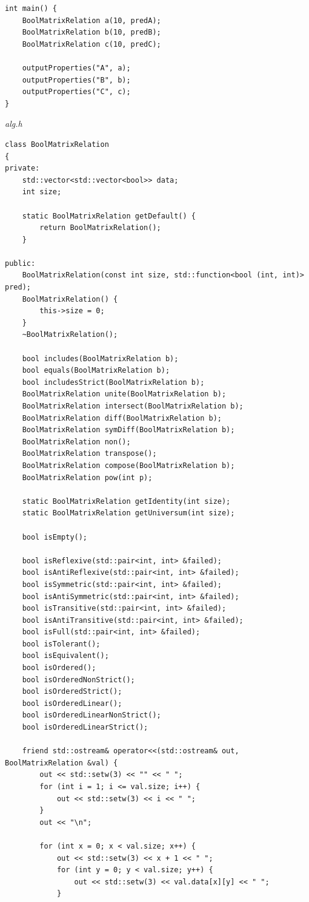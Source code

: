 \documentclass[a4paper,14pt]{extarticle}
\begin{document}
\begin{enumerate}[label=2.\arabic*.]
\begin{verbatim}
int main() {
    BoolMatrixRelation a(10, predA);
    BoolMatrixRelation b(10, predB);
    BoolMatrixRelation c(10, predC);

    outputProperties("A", a);
    outputProperties("B", b);
    outputProperties("C", c);
}
    	\end{verbatim}
	      \textit{alg.h}
	      \begin{verbatim}
class BoolMatrixRelation
{
private:
    std::vector<std::vector<bool>> data;
    int size;

    static BoolMatrixRelation getDefault() {
        return BoolMatrixRelation();
    }

public:
    BoolMatrixRelation(const int size, std::function<bool (int, int)> pred);
    BoolMatrixRelation() {
        this->size = 0;
    }
    ~BoolMatrixRelation();

    bool includes(BoolMatrixRelation b);
    bool equals(BoolMatrixRelation b);
    bool includesStrict(BoolMatrixRelation b);
    BoolMatrixRelation unite(BoolMatrixRelation b);
    BoolMatrixRelation intersect(BoolMatrixRelation b);
    BoolMatrixRelation diff(BoolMatrixRelation b);
    BoolMatrixRelation symDiff(BoolMatrixRelation b);
    BoolMatrixRelation non();
    BoolMatrixRelation transpose();
    BoolMatrixRelation compose(BoolMatrixRelation b);
    BoolMatrixRelation pow(int p);

    static BoolMatrixRelation getIdentity(int size);
    static BoolMatrixRelation getUniversum(int size);

    bool isEmpty();

    bool isReflexive(std::pair<int, int> &failed);
    bool isAntiReflexive(std::pair<int, int> &failed);
    bool isSymmetric(std::pair<int, int> &failed);
    bool isAntiSymmetric(std::pair<int, int> &failed);
    bool isTransitive(std::pair<int, int> &failed);
    bool isAntiTransitive(std::pair<int, int> &failed);
    bool isFull(std::pair<int, int> &failed);
    bool isTolerant();
    bool isEquivalent();
    bool isOrdered();
    bool isOrderedNonStrict();
    bool isOrderedStrict();
    bool isOrderedLinear();
    bool isOrderedLinearNonStrict();
    bool isOrderedLinearStrict();

    friend std::ostream& operator<<(std::ostream& out, BoolMatrixRelation &val) {
        out << std::setw(3) << "" << " ";
        for (int i = 1; i <= val.size; i++) {
            out << std::setw(3) << i << " ";
        }
        out << "\n";

        for (int x = 0; x < val.size; x++) {
            out << std::setw(3) << x + 1 << " ";
            for (int y = 0; y < val.size; y++) {
                out << std::setw(3) << val.data[x][y] << " ";
            }


\end{verbatim}
\end{enumerate}
\end{document}
